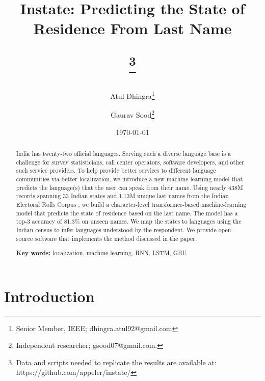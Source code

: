 \documentclass[11pt,  letterpaper]{article}
\title{Instate: Predicting the State of Residence From Last Name

\thanks{Data and scripts needed to replicate the results are available at: https://github.com/appeler/instate/}}
\author{Atul Dhingra\thanks{Senior Member, IEEE; \textsf{dhingra.atul92@gmail.com}} \and Gaurav Sood\thanks{Independent researcher;  \textsf{gsood07@gmail.com}.}}
\date{\today}
\begin{document}
\maketitle

\begin{abstract}

India has twenty-two official languages. Serving such a diverse language base is a challenge for survey statisticians, call center operators, software developers, and other such service providers. To help provide better services to different language communities via better localization, we introduce a new machine learning model that predicts the language(s) that the user can speak from their name. Using nearly 438M records spanning 33 Indian states and 1.13M unique last names from the Indian Electoral Rolls Corpus \citep{DVN/OG47IV_2023}, we build a character-level transformer-based machine-learning model that predicts the state of residence based on the last name. The model has a top-3 accuracy of 81.3\% on unseen names. We map the states to languages using the Indian census to infer languages understood by the respondent. We provide open-source software that implements the method discussed in the paper.

\smallskip

\textbf{Key words:} localization, machine learning, RNN, LSTM, GRU


\end{abstract}








\section{Introduction}
\end{document}
